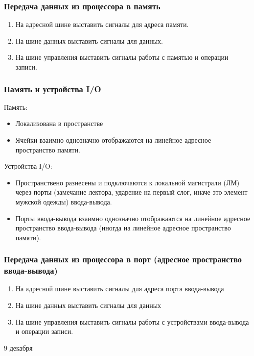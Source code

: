\documentclass[12pt, a4paper]{article}
\begin{document}
    \subsubsection{Передача данных из процессора в память}
    \begin{enumerate}
        \item На адресной шине выставить сигналы для адреса памяти.
        \item На шине данных выставить сигналы для данных.
        \item На шине управления выставить сигналы работы с памятью и операции записи.
    \end{enumerate} 
    \subsubsection{Память и устройства I/O}
    Память:
    \begin{itemize}
        \item Локализована в пространстве
        \item Ячейки взаимно однозначно отображаются на линейное адресное пространство памяти.
    \end{itemize}
    Устройства I/O:
    \begin{itemize}
        \item Пространствено разнесены и подключаются к локальной магистрали (ЛМ) через порты (замечание лектора, ударение на первый слог, иначе это элемент мужской одежды) ввода-вывода.
        \item Порты ввода-вывода взаимно однозначно отображаются на линейное адресное пространство ввода-вывода (иногда на линейное адресное пространство памяти).
    \end{itemize}
    \subsubsection{Передача данных из процессора в порт (адресное пространство ввода-вывода)}
    \begin{enumerate}
        \item На адресной шине выставить сигналы для адреса порта ввода-вывода
        \item На шине данных выставить сигналы для данных
        \item На шине управления выставить сигналы работы с устройствами ввода-вывода и операции записи.
    \end{enumerate}
    \begin{center}
        9 декабря
    \end{center}
\end{document}
